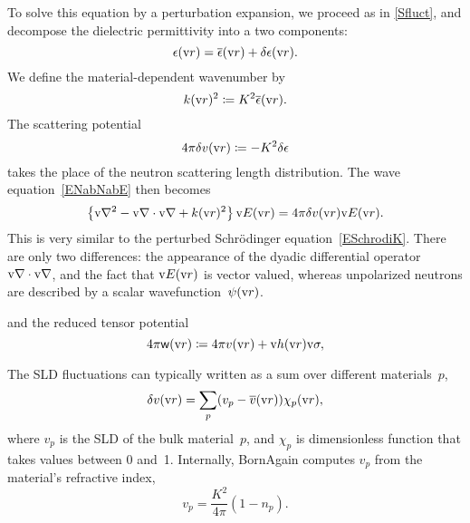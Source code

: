 To solve this equation by a perturbation expansion,
%
we proceed as in \cref{Sfluct},
and decompose the dielectric permittivity
into a two components:
\begin{equation}
  \epsilon(\text{v}{r}) = \overline{\epsilon}(\text{v}{r}) + \delta\epsilon(\text{v}{r}).
\end{equation}
%
%
We define the material-dependent wavenumber by
%
\begin{equation}
  k(\text{v}{r})^2 \coloneqq K^2 \overline{\epsilon}(\text{v}{r}).
\end{equation}
The scattering potential
%
\begin{equation}
  4\pi\delta v(\text{v}{r}) \coloneqq - K^2\delta\epsilon
\end{equation}
takes the place of the neutron scattering length distribution.
The wave equation~\cref{ENabNabE} then becomes
\begin{equation}\label{EwaveE3}
  \left\{\text{v}{\nabla}^2-\text{v}{\nabla}\cdot\text{v}{\nabla} + k(\text{v}{r})^2\right\}\text{v}{E}(\text{v}{r})
  = 4\pi\delta v(\text{v}{r})\text{v}{E}(\text{v}{r}).
\end{equation}
%
%
This is very similar to the perturbed Schrödinger equation~\cref{ESchrodiK}.
%
%
There are only two differences:
the appearance of the dyadic differential operator $\text{v}{\nabla}\cdot\text{v}{\nabla}$,
and the fact that $\text{v}{E}(\text{v}{r})$ is vector valued,
whereas unpolarized neutrons are described by a scalar wavefunction~$\psi(\text{v}{r})$.

and the reduced tensor potential
%
%
\begin{equation}
  4\pi\mathsf{w}(\text{v}{r})\coloneqq4\pi v(\text{v}{r}) + \text{v}{h}(\text{v}{r})\text{v}{\sigma},
\end{equation}

The SLD fluctuations can typically written as a sum over different materials~$p$,
\begin{equation}
  \delta v(\text{v}{r}) = \sum_p (v_p-\overline{v}(\text{v}{r})) \chi_p(\text{v}{r}),
\end{equation}
where $v_p$ is the SLD of the bulk material~$p$,
and $\chi_p$ is dimensionless function that takes values between 0 and~1.
Internally, BornAgain computes $v_p$ from the material's refractive index,
\begin{equation}
  v_p = \frac{K^2}{4\pi}(1-n_p).
\end{equation}

